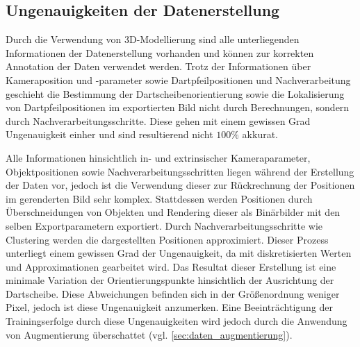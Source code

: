 \subsection{Ungenauigkeiten der Datenerstellung}  %
\label{sec:daten_ungenauigkeiten}

Durch die Verwendung von 3D-Modellierung sind alle unterliegenden Informationen der Datenerstellung vorhanden und können zur korrekten Annotation der Daten verwendet werden. Trotz der Informationen über Kameraposition und -parameter sowie Dartpfeilpositionen und Nachverarbeitung geschieht die Bestimmung der Dartscheibenorientierung sowie die Lokalisierung von Dartpfeilpositionen im exportierten Bild nicht durch Berechnungen, sondern durch Nachverarbeitungsschritte. Diese gehen mit einem gewissen Grad Ungenauigkeit einher und sind resultierend nicht $100\%$ akkurat.

Alle Informationen hinsichtlich in- und extrinsischer Kameraparameter, Objektpositionen sowie Nachverarbeitungsschritten liegen während der Erstellung der Daten vor, jedoch ist die Verwendung dieser zur Rückrechnung der Positionen im gerenderten Bild sehr komplex. Stattdessen werden Positionen durch Überschneidungen von Objekten und Rendering dieser als Binärbilder mit den selben Exportparametern exportiert. Durch Nachverarbeitungsschritte wie Clustering werden die dargestellten Positionen approximiert. Dieser Prozess unterliegt einem gewissen Grad der Ungenauigkeit, da mit diskretisierten Werten und Approximationen gearbeitet wird. Das Resultat dieser Erstellung ist eine minimale Variation der Orientierungspunkte hinsichtlich der Ausrichtung der Dartscheibe. Diese Abweichungen befinden sich in der Größenordnung weniger Pixel, jedoch ist diese Ungenauigkeit anzumerken. Eine Beeinträchtigung der Trainingserfolge durch diese Ungenauigkeiten wird jedoch durch die Anwendung von Augmentierung überschattet (vgl. \autoref{sec:daten_augmentierung}).
